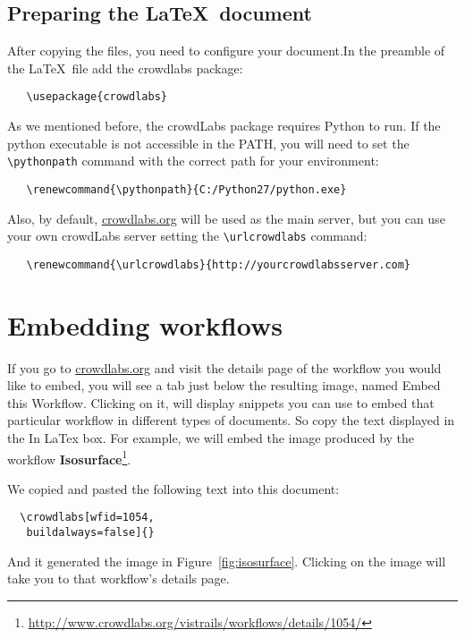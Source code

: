 \documentclass{article}
\begin{document}
\subsection{Preparing the \LaTeX\ document}

After copying the files, you need to configure your document.In the
preamble of the \LaTeX\ file add the crowdlabs package: 
\begin{verbatim}
   \usepackage{crowdlabs}
\end{verbatim}

As we mentioned before, the crowdLabs package requires Python to
run. If the python executable is not accessible in the PATH, you will
need to set the \texttt{\textbackslash pythonpath} command with the correct path for your environment:
 
\begin{verbatim}
   \renewcommand{\pythonpath}{C:/Python27/python.exe}
\end{verbatim}

Also, by default, \url{crowdlabs.org} will be used as the main server, but
you can use your own crowdLabs server setting the \texttt{\textbackslash urlcrowdlabs} command: 
\begin{verbatim}
   \renewcommand{\urlcrowdlabs}{http://yourcrowdlabsserver.com}
\end{verbatim}

\section{Embedding workflows}
If you go to \url{crowdlabs.org} and visit the details page of the
workflow you would like to embed, you will see a tab just below the
resulting image, named \textsf{Embed this Workflow}. Clicking on it,
will display snippets you can use to embed that particular workflow in
different types of documents. So copy the text displayed in the
\textsf{In LaTex} box. For example, we will embed the image produced
by the workflow
\textbf{Isosurface}\footnote{\url{http://www.crowdlabs.org/vistrails/workflows/details/1054/}}.

We copied and pasted the following text into this document:
\begin{verbatim}
  \crowdlabs[wfid=1054,
   buildalways=false]{}
\end{verbatim}

And it generated the image in Figure~\ref{fig:isosurface}. Clicking on the image will take you to that workflow's details page.
\end{document}
